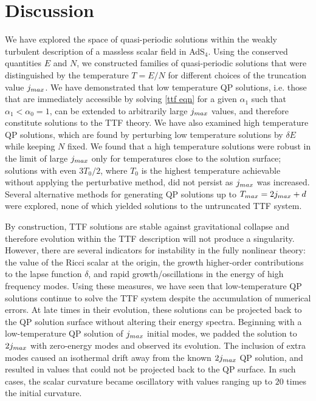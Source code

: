 \documentclass[../PhD.tex]{subfiles}
\begin{document}

\section{Discussion}
\label{sec: ttf discussion}

We have explored the space of quasi-periodic solutions within the weakly turbulent description of a massless scalar field in AdS$_4$. Using the conserved quantities $E$ and $N$, we constructed families of quasi-periodic solutions that were distinguished by the temperature $T = E/N$ for different choices of the truncation value $j_{max}$. We have demonstrated that low temperature QP solutions, i.e. those that are immediately accessible by solving \eqref{ttf eqn} for a given $\alpha_1$ such that $\alpha_1 < \alpha_0 = 1$, can be extended to arbitrarily large $j_{max}$ values, and therefore constitute solutions to the TTF theory. We have also examined high temperature QP solutions, which are found by perturbing low temperature solutions by $\delta E$ while keeping $N$ fixed. We found that a high temperature solutions were robust in the limit of large $j_{max}$ only for temperatures close to the solution surface; solutions with even $3 T_0 / 2$, where $T_0$ is the highest temperature achievable without applying the perturbative method, did not persist as $j_{max}$ was increased. Several alternative methods for generating QP solutions up to $T_{max} = 2j_{max} + d$ were explored, none of which yielded solutions to the untruncated TTF system.

By construction, TTF solutions are stable against gravitational collapse and therefore evolution within the TTF description will not produce a singularity. However, there are several indicators for instability in the fully nonlinear theory: the value of the Ricci scalar at the origin, the growth higher-order contributions to the lapse function $\delta$, and rapid growth/oscillations in the energy of high frequency modes. Using these measures, we have seen that low-temperature QP solutions continue to solve the TTF system despite the accumulation of numerical errors. At late times in their evolution, these solutions can be projected back to the QP solution surface without altering their energy spectra. Beginning with a low-temperature QP solution of $j_{max}$ initial modes, we padded the solution to $2j_{max}$ with zero-energy modes and observed its evolution. The inclusion of extra modes caused an isothermal drift away from the known $2j_{max}$ QP solution, and resulted in values that could not be projected back to the QP surface. In such cases, the scalar curvature became oscillatory with values ranging up to $20$ times the initial curvature.
\end{document}
